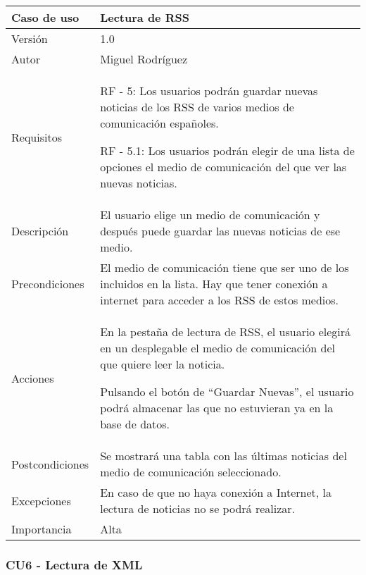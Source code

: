\begin{center}
\begin{tabular}{ | m{3cm} | m{10cm}| } 
\hline
Caso de uso & Lectura de RSS \\ 
\hline
Versión & 1.0 \\ 
\hline
Autor & Miguel Rodríguez \\ 
\hline
Requisitos & RF - 5: Los usuarios podrán guardar nuevas noticias de 
los RSS de varios medios de comunicación españoles.

RF - 5.1: Los usuarios podrán elegir de una lista de opciones el medio de comunicación del que ver las nuevas noticias.
\\ 
\hline
Descripción & El usuario elige un medio de comunicación y después puede guardar las nuevas noticias de ese medio. \\
\hline
Precondiciones & El medio de comunicación tiene que ser uno de los incluidos en la lista. Hay que tener conexión a internet para acceder a los RSS de estos medios. \\
\hline
Acciones & En la pestaña de lectura de RSS, el usuario elegirá en un desplegable el medio de comunicación del que quiere leer la noticia.

Pulsando el botón de ``Guardar Nuevas'', el usuario podrá almacenar las que no estuvieran ya en la base de datos. \\
\hline
Postcondiciones & Se mostrará una tabla con las últimas noticias del medio de comunicación seleccionado. \\
\hline
Excepciones & En caso de que no haya conexión a Internet, la lectura de noticias no se podrá realizar. \\
\hline 
Importancia & Alta \\
\hline 
\end{tabular}
\end{center}

\clearpage
\subsubsection{CU6 - Lectura de XML}

